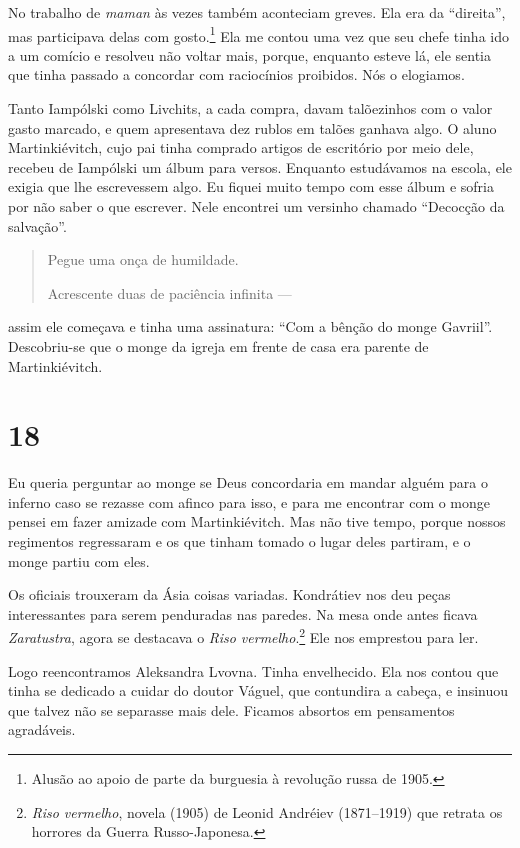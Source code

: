 No trabalho de \emph{maman} às vezes também aconteciam greves. Ela era
da ``direita'', mas participava delas com gosto.\footnote{Alusão ao
  apoio de parte da burguesia à revolução russa de 1905.} Ela me contou
uma vez que seu chefe tinha ido a um comício e resolveu não voltar mais,
porque, enquanto esteve lá, ele sentia que tinha passado a concordar com
raciocínios proibidos. Nós o elogiamos.

Tanto Iampólski como Livchits, a cada compra, davam talõezinhos com o
valor gasto marcado, e quem apresentava dez rublos em talões ganhava
algo. O aluno Martinkiévitch, cujo pai tinha comprado artigos de
escritório por meio dele, recebeu de Iampólski um álbum para versos.
Enquanto estudávamos na escola, ele exigia que lhe escrevessem algo. Eu
fiquei muito tempo com esse álbum e sofria por não saber o que escrever.
Nele encontrei um versinho chamado ``Decocção da salvação''.

\begin{quotation}
Pegue uma onça de humildade.

Acrescente duas de paciência infinita ---
\end{quotation}

assim ele começava e tinha uma assinatura: ``Com a bênção do monge
Gavriil''. Descobriu-se que o monge da igreja em frente de casa era
parente de Martinkiévitch.

\section{18}

Eu queria perguntar ao monge se Deus concordaria em mandar alguém para o
inferno caso se rezasse com afinco para isso, e para me encontrar com o
monge pensei em fazer amizade com Martinkiévitch. Mas não tive tempo,
porque nossos regimentos regressaram e os que tinham tomado o lugar
deles partiram, e o monge partiu com eles.

Os oficiais trouxeram da Ásia coisas variadas. Kondrátiev nos deu peças
interessantes para serem penduradas nas paredes. Na mesa onde antes
ficava \emph{Zaratustra}, agora se destacava o \emph{Riso
vermelho}.\footnote{\emph{Riso vermelho}, novela (1905) de Leonid
  Andréiev (1871--1919) que retrata os horrores da Guerra
  Russo-Japonesa.} Ele nos emprestou para ler.

Logo reencontramos Aleksandra Lvovna. Tinha envelhecido. Ela nos contou
que tinha se dedicado a cuidar do doutor Váguel, que contundira a
cabeça, e insinuou que talvez não se separasse mais dele. Ficamos
absortos em pensamentos agradáveis.


